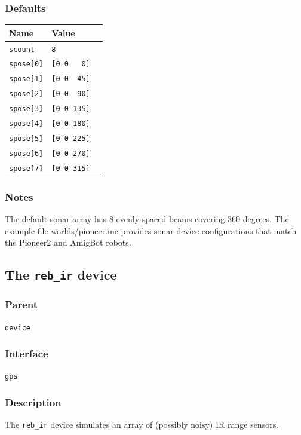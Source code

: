\documentclass[11pt,twoside]{report}
\begin{document}
\subsubsection*{Defaults}
\begin{tabularx}{\columnwidth}{llX}
\hline
Name & Value\\
\hline
\verb'scount' & \verb'8'\\
\verb'spose[0]' & \verb'[0 0   0]'\\
\verb'spose[1]' & \verb'[0 0  45]'\\
\verb'spose[2]' & \verb'[0 0  90]'\\
\verb'spose[3]' & \verb'[0 0 135]'\\
\verb'spose[4]' & \verb'[0 0 180]'\\
\verb'spose[5]' & \verb'[0 0 225]'\\
\verb'spose[6]' & \verb'[0 0 270]'\\
\verb'spose[7]' & \verb'[0 0 315]'\\
\hline
\end{tabularx}

\subsubsection*{Notes}
The default sonar array has 8 evenly spaced beams covering 360
degrees. The example file worlds/pioneer.inc provides sonar device
configurations that match the Pioneer2 and AmigBot robots.

\newpage
\subsection{The {\tt reb\_ir} device}

\subsubsection*{Parent}
{\tt device}

\subsubsection*{Interface}
{\tt gps}

\subsubsection*{Description}
The {\tt reb\_ir} device simulates an array of (possibly noisy) IR range sensors.
\end{document}
